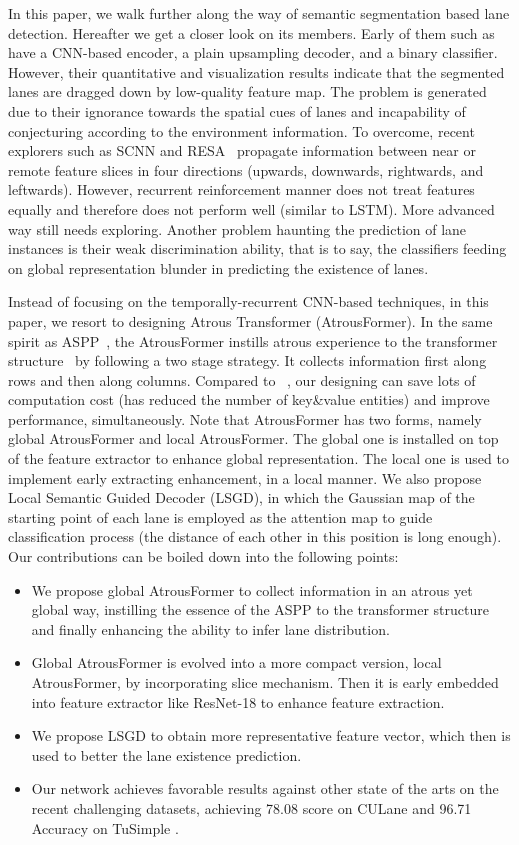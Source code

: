 \documentclass[preprint,12pt,review]{elsarticle}
\begin{document}
In this paper, we walk further along the way of semantic segmentation based lane detection. Hereafter we get a closer look on its members. Early of them such as \cite{erfnet,rbnet,gan,liulane} have a CNN-based encoder, a plain upsampling decoder, and a binary classifier. However, their quantitative and visualization results indicate that the segmented lanes are dragged down by low-quality feature map. The problem is generated due to their ignorance towards the spatial cues of lanes and incapability of conjecturing according to the environment information. To overcome, recent explorers such as SCNN \cite{
SCNN} and RESA~\cite{resa} propagate information between near or remote feature slices in four directions (upwards, downwards, rightwards, and leftwards). However, recurrent reinforcement manner does not treat features equally and therefore does not perform well (similar to LSTM). More advanced way still needs exploring. Another problem haunting the prediction of lane instances is their weak discrimination ability, that is to say, the classifiers feeding on global representation blunder in predicting the existence of lanes.

Instead of focusing on the temporally-recurrent CNN-based techniques, in this paper, we resort to designing Atrous Transformer (AtrousFormer). In the same spirit as ASPP~\cite{aspp}, the AtrousFormer instills atrous experience to the transformer structure~\cite{transformer} by following a two stage strategy. It collects information first along rows and then along columns. Compared to ~\cite{transformer}, our designing can save lots of computation cost (has reduced the number of key\&value entities) and improve performance, simultaneously. Note that AtrousFormer has  two forms, namely global AtrousFormer and local AtrousFormer. The global one is installed on top of the feature extractor to enhance global representation. The local one is used to implement early extracting enhancement, in a local manner. We also propose Local Semantic  Guided  Decoder (LSGD), in which the Gaussian map of the starting point of each lane is employed as the attention map to guide classification process (the distance of each other in this position is long enough). Our contributions can be boiled down into the following points: 


\begin{itemize}
	\item We propose global AtrousFormer to collect information in an atrous yet global way, instilling the essence of the ASPP to the transformer structure and finally enhancing the ability to infer lane distribution. 
	\item Global AtrousFormer is evolved into a more compact version, local AtrousFormer, by incorporating slice mechanism. Then it is early embedded into feature extractor like ResNet-18 to enhance feature extraction.
	\item We propose LSGD to obtain more representative feature vector, which then is used to better the lane existence prediction. 
	\item Our network achieves favorable results against other state of the arts on the recent challenging datasets, achieving 78.08  score on CULane \cite{SCNN} and 96.71 Accuracy on TuSimple \cite{tusimple}.
\end{itemize}
\end{document}
